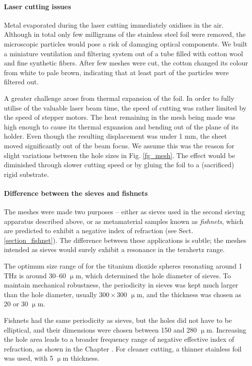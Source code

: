 \paragraph{Laser cutting issues}%
Metal evaporated during the laser cutting immediately oxidises in the air. Although in total only few milligrams of the stainless steel foil were removed, the microscopic particles would pose a risk of damaging optical components. We built a miniature ventilation and filtering system out of a tube filled with cotton wool and fine synthetic fibers. After few meshes were cut, the cotton changed its colour from white to pale brown, indicating that at least part of the particles were filtered out.

A greater challenge arose from thermal expansion of the foil. In order to fully utilise of the valuable laser beam time, the speed of cutting was rather limited by the speed of stepper motors. The heat remaining in the mesh being made was high enough to cause its thermal expansion and bending out of the plane of its holder. Even though the resulting displacement was under 1 mm, the sheet moved significantly out of the beam focus. We assume this was the reason for slight variations between the hole sizes in Fig. \ref{fg_mesh}. The effect would be diminished through slower cutting speed or by gluing the foil to a (sacrificed) rigid substrate.

\paragraph{Difference between the sieves and fishnets}%
The meshes were made two purposes -- either as sieves used in the second sieving apparatus described above, or as metamaterial samples known as \textit{fishnets}, which are predicted to exhibit a negative index of refraction (see Sect. \ref{section_fishnet}). The difference between these applications is subtle; the meshes intended as sieves would surely exhibit a resonance in the terahertz range. 

The optimum  size range of for the titanium dioxide spheres resonating around 1 THz is around 30--60 $\upmu$m, which determined the hole diameter of sieves. To maintain mechanical robustness, the periodicity in sieves was kept much larger than the hole diameter, usually $300\times 300$ $\upmu$m, and the thickness was chosen as 20 or 30 $\upmu$m.

Fishnets had the same periodicity as sieves, but the holes did not have to be elliptical, and their dimensions were chosen between 150 and 280 $\upmu$m. Increasing the hole area leads to a broader frequency range of negative effective index of refraction, as shown in the Chapter \pageref{section_fishnet}. For cleaner cutting, a thinner stainless foil was used, with 5 $\upmu$m thickness.



